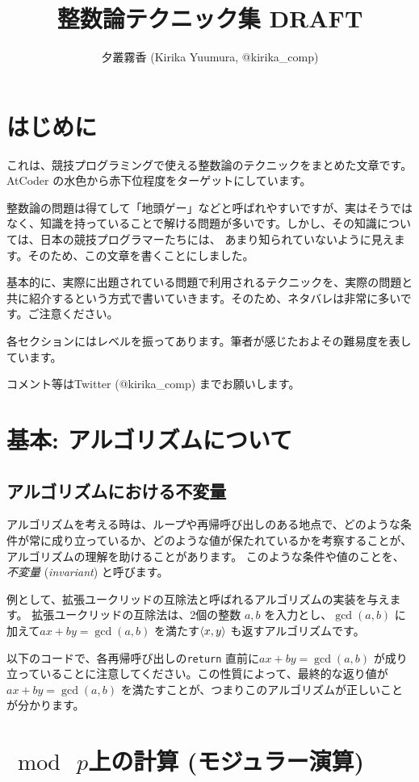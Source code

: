 \documentclass{jsarticle}
\author{夕叢霧香 (Kirika Yuumura, @kirika\_comp)}
\title{整数論テクニック集 DRAFT}
\begin{document}
\maketitle
 \section*{はじめに}
 これは、競技プログラミングで使える整数論のテクニックをまとめた文章です。
 AtCoder の水色から赤下位程度をターゲットにしています。

 整数論の問題は得てして「地頭ゲー」などと呼ばれやすいですが、実はそうではなく、知識を持っていることで解ける問題が多いです。しかし、その知識については、日本の競技プログラマーたちには、
 あまり知られていないように見えます。そのため、この文章を書くことにしました。

 基本的に、実際に出題されている問題で利用されるテクニックを、実際の問題と共に紹介するという方式で書いていきます。そのため、ネタバレは非常に多いです。ご注意ください。

 各セクションにはレベルを振ってあります。筆者が感じたおよその難易度を表しています。

 コメント等はTwitter (@kirika\_comp) までお願いします。
\tableofcontents
 \section{基本: アルゴリズムについて}
  \subsection{アルゴリズムにおける不変量}
  \label{subsec:invariant}
  アルゴリズムを考える時は、ループや再帰呼び出しのある地点で、どのような条件が常に成り立っているか、どのような値が保たれているかを考察することが、アルゴリズムの理解を助けることがあります。
  このような条件や値のことを、\emph{不変量} (\emph{invariant}) と呼びます。

  例として、拡張ユークリッドの互除法と呼ばれるアルゴリズムの実装を与えます。
  拡張ユークリッドの互除法は、2個の整数 $a, b$ を入力とし、$\gcd(a, b)$ に加えて$ax + by = \gcd(a, b)$ を満たす$\langle{x, y}\rangle$ も返すアルゴリズムです。

  以下のコードで、各再帰呼び出しの\verb+return+ 直前に$ax+by=\gcd(a,b)$ が成り立っていることに注意してください。この性質によって、最終的な返り値が $ax+by=\gcd(a,b)$ を満たすことが、つまりこのアルゴリズムが正しいことが分かります。
  
 \section{$\bmod\ p$上の計算 (モジュラー演算)}
 \label{sec:mod-p-arithmetic}
\end{document}
